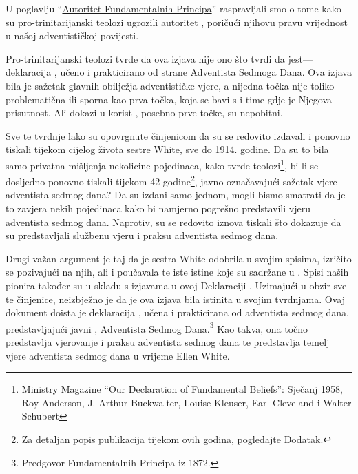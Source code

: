 U poglavlju “\hyperref[chap:authority]{Autoritet Fundamentalnih Principa}” raspravljali smo o tome kako su pro-trinitarijanski teolozi ugrozili autoritet , poričući njihovu pravu vrijednost u našoj adventističkoj povijesti.

Pro-trinitarijanski teolozi tvrde da ova izjava nije ono što tvrdi da jest—deklaracija , učeno i prakticirano od strane Adventista Sedmoga Dana. Ova izjava bila je sažetak glavnih obilježja adventističke vjere, a nijedna točka nije toliko problematična ili sporna kao prva točka, koja se bavi s  i time gdje je Njegova prisutnost. Ali dokazi u korist , posebno prve točke, su nepobitni.

Sve te tvrdnje lako su opovrgnute činjenicom da su se  redovito izdavali i ponovno tiskali tijekom cijelog života sestre White, sve do 1914. godine. Da su to bila samo privatna mišljenja nekolicine pojedinaca, kako tvrde teolozi\footnote{Ministry Magazine “Our Declaration of Fundamental Beliefs”: Sječanj 1958, Roy Anderson, J. Arthur Buckwalter, Louise Kleuser, Earl Cleveland i Walter Schubert}, bi li se dosljedno ponovno tiskali tijekom 42 godine\footnote{Za detaljan popis publikacija tijekom ovih godina, pogledajte Dodatak.}, javno označavajući sažetak vjere adventista sedmog dana? Da su izdani samo jednom, mogli bismo smatrati da je to zavjera nekih pojedinaca kako bi namjerno pogrešno predstavili vjeru adventista sedmog dana. Naprotiv,  su se redovito iznova tiskali što dokazuje da su predstavljali službenu vjeru i praksu adventista sedmog dana.

Drugi važan argument je taj da je sestra White odobrila  u svojim spisima, izričito se pozivajući na njih, ali i poučavala te iste istine koje su sadržane u . Spisi naših pionira također su u skladu s izjavama u ovoj Deklaraciji . Uzimajući u obzir sve te činjenice, neizbježno je da je ova izjava bila istinita u svojim tvrdnjama. Ovaj dokument doista je deklaracija , učena i prakticirana od adventista sedmog dana, predstavljajući javni ,  Adventista Sedmog Dana.\footnote{Predgovor Fundamentalnih Principa iz 1872.} Kao takva, ona točno predstavlja vjerovanje i praksu adventista sedmog dana te predstavlja temelj vjere adventista sedmog dana u vrijeme Ellen White.

